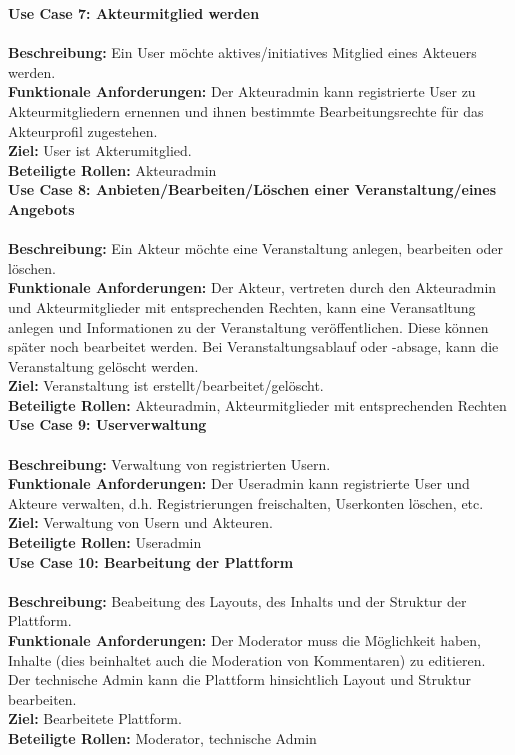 \documentclass{swp}
\begin{document}
\textbf{Use Case 7: Akteurmitglied werden}\\\\
\textbf{Beschreibung: }Ein User m\"ochte aktives/initiatives Mitglied eines Akteuers werden.\\
\textbf{Funktionale Anforderungen: }Der Akteuradmin kann registrierte User zu Akteurmitgliedern ernennen und ihnen bestimmte Bearbeitungsrechte f\"ur das Akteurprofil zugestehen.\\
\textbf{Ziel: }User ist Akterumitglied.\\
\textbf{Beteiligte Rollen: }Akteuradmin\\

\textbf{Use Case 8: Anbieten/Bearbeiten/L\"oschen einer Veranstaltung/eines Angebots}\\\\
\textbf{Beschreibung: }Ein Akteur m\"ochte eine Veranstaltung anlegen, bearbeiten oder l\"oschen.\\
\textbf{Funktionale Anforderungen: }Der Akteur, vertreten durch den Akteuradmin und Akteurmitglieder mit entsprechenden Rechten, kann eine Veransatltung anlegen und Informationen zu der Veranstaltung ver\"offentlichen. Diese k\"onnen sp\"ater noch bearbeitet werden. Bei Veranstaltungsablauf oder -absage, kann die Veranstaltung gel\"oscht werden.\\
\textbf{Ziel: }Veranstaltung ist erstellt/bearbeitet/gel\"oscht.\\
\textbf{Beteiligte Rollen: }Akteuradmin, Akteurmitglieder mit entsprechenden Rechten\\

\textbf{Use Case 9: Userverwaltung}\\\\
\textbf{Beschreibung: }Verwaltung von registrierten Usern.\\
\textbf{Funktionale Anforderungen: }Der Useradmin kann registrierte User und Akteure verwalten, d.h. Registrierungen freischalten, Userkonten l\"oschen, etc.\\
\textbf{Ziel: }Verwaltung von Usern und Akteuren.\\
\textbf{Beteiligte Rollen: }Useradmin\\

\textbf{Use Case 10: Bearbeitung der Plattform}\\\\
\textbf{Beschreibung: }Beabeitung des Layouts, des Inhalts und der Struktur der Plattform.\\
\textbf{Funktionale Anforderungen: }Der Moderator muss die M\"oglichkeit haben, Inhalte (dies beinhaltet auch die Moderation von Kommentaren) zu editieren.\\
Der technische Admin kann die Plattform hinsichtlich Layout und Struktur bearbeiten.\\
\textbf{Ziel: }Bearbeitete Plattform.\\
\textbf{Beteiligte Rollen: }Moderator, technische Admin\\
\end{document}
